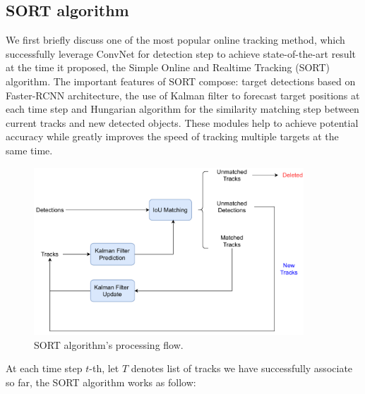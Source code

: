 \subsection{SORT algorithm}
\label{sec:sort}
We first briefly discuss one of the most popular online tracking method, which successfully leverage ConvNet for detection step to achieve state-of-the-art result at the time it proposed, the Simple Online and Realtime Tracking (SORT) \cite{bewley2016simple} algorithm.
The important features of SORT compose: target detections based on Faster-RCNN \cite{NIPS2015_14bfa6bb} architecture, the use of Kalman filter \cite{kalman1960new} to forecast target positions at each time step and Hungarian algorithm \cite{kuhn1955hungarian} for the similarity matching step between current tracks and new detected objects. These modules help to achieve potential accuracy while greatly improves the speed of tracking multiple targets at the same time. \\
\begin{figure}[t!]
    \centering
    \includegraphics[width=0.9\textwidth]{images/SORT.pdf}
    \caption{SORT algorithm's processing flow.}
    \label{fig:SORT_overview}
\end{figure}
At each time step $t$-th, let $T$ denotes list of tracks we have successfully associate so far, the SORT algorithm works as follow:
